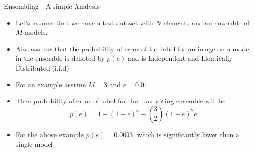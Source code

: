 \documentclass[10pt]{beamer}
\theoremstyle{remark}
\theoremstyle{definition}
\begin{document}






\begin{frame}{Ensembling - A simple Analysis}
    
\begin{itemize}
    \item Let’s assume that we have a test dataset with $N$ elements and an ensemble of $M$ models.
    \item Also assume that the probability of error of the label for an image on a model in the ensemble is denoted by $p(e)$ and is Independent and Identically Distributed (i.i.d)
    \item For an example assume $M=3$ and $e =0.01$
    \item Then probability of error of label for the max voting ensemble will be
    $$p(e) = 1 - (1-e)^3 - \binom 32 (1-e)^2 e$$
    \item For the above example $p(e)=0.0003$, which is significantly lower than a single model
\end{itemize}
\end{frame}
\end{document}
